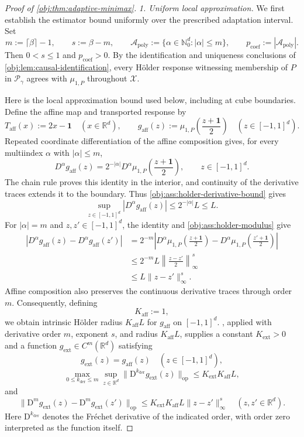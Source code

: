 \begin{proof}[Proof of \cref{obj:thm:adaptive-minimax}]
\emph{1. Uniform local approximation.}
We first establish the estimator bound uniformly over the prescribed adaptation interval. Set
\[
m:=\lceil\beta\rceil-1,\qquad
s:=\beta-m,\qquad
\mathcal A_{\mathrm{poly}}
:=\{\alpha\in\mathbb N_0^d:|\alpha|\le m\},
\qquad
p_{\mathrm{coef}}:=|\mathcal A_{\mathrm{poly}}|.
\]
Then \(0<s\le1\) and \(p_{\mathrm{coef}}>0\). By the identification and uniqueness conclusions of \cref{obj:lem:causal-identification}, every Hölder response witnessing membership of \(P\) in \(\mathcal P_\gamma\) agrees with \(\mu_{1,P}\) throughout \(\mathcal X\).

Here is the local approximation bound used below, including at cube boundaries. Define the affine map and transported response by
\[
T_{\mathrm{aff}}(x):=2x-\mathbf1
\quad(x\in\mathbb R^d),
\qquad
g_{\mathrm{aff}}(z)
:=\mu_{1,P}\!\left(\frac{z+\mathbf1}{2}\right)
\quad(z\in[-1,1]^d).
\]
Repeated coordinate differentiation of the affine composition gives, for every multiindex \(\alpha\) with \(|\alpha|\le m\),
\[
D^\alpha g_{\mathrm{aff}}(z)
=
2^{-|\alpha|}D^\alpha\mu_{1,P}\!\left(\frac{z+\mathbf1}{2}\right),
\qquad z\in[-1,1]^d.
\]
The chain rule proves this identity in the interior, and continuity of the derivative traces extends it to the boundary. Thus \cref{obj:ass:holder-derivative-bound} gives
\[
\sup_{z\in[-1,1]^d}|D^\alpha g_{\mathrm{aff}}(z)|
\le 2^{-|\alpha|}L\le L.
\]
For \(|\alpha|=m\) and \(z,z'\in[-1,1]^d\), the identity and \cref{obj:ass:holder-modulus} give
\[
\begin{aligned}
|D^\alpha g_{\mathrm{aff}}(z)-D^\alpha g_{\mathrm{aff}}(z')|
&=2^{-m}\left|
D^\alpha\mu_{1,P}\!\left(\frac{z+\mathbf1}{2}\right)
-D^\alpha\mu_{1,P}\!\left(\frac{z'+\mathbf1}{2}\right)
\right|
\\
&\le 2^{-m}L
\left\|\frac{z-z'}2\right\|_\infty^s
\\
&\le L\|z-z'\|_\infty^s.
\end{aligned}
\]
Affine composition also preserves the continuous derivative traces through order \(m\). Consequently, defining
\[
K_{\mathrm{aff}}:=1,
\]
we obtain intrinsic Hölder radius \(K_{\mathrm{aff}}L\) for \(g_{\mathrm{aff}}\) on \([-1,1]^d\). , applied with derivative order \(m\), exponent \(s\), and radius \(K_{\mathrm{aff}}L\), supplies a constant \(K_{\mathrm{ext}}>0\) and a function \(g_{\mathrm{ext}}\in C^m(\mathbb R^d)\) satisfying
\[
g_{\mathrm{ext}}(z)=g_{\mathrm{aff}}(z)
\quad(z\in[-1,1]^d),
\]
\[
\max_{0\le k_{\mathrm{der}}\le m}
\sup_{z\in\mathbb R^d}
\|\mathrm D^{k_{\mathrm{der}}}g_{\mathrm{ext}}(z)\|_{\mathrm{op}}
\le K_{\mathrm{ext}}K_{\mathrm{aff}}L,
\]
and
\[
\|\mathrm D^m g_{\mathrm{ext}}(z)
-\mathrm D^m g_{\mathrm{ext}}(z')\|_{\mathrm{op}}
\le
K_{\mathrm{ext}}K_{\mathrm{aff}}L
\|z-z'\|_\infty^s
\quad(z,z'\in\mathbb R^d).
\]
Here \(\mathrm D^{k_{\mathrm{der}}}\) denotes the Fréchet derivative of the indicated order, with order zero interpreted as the function itself.


\end{proof}
